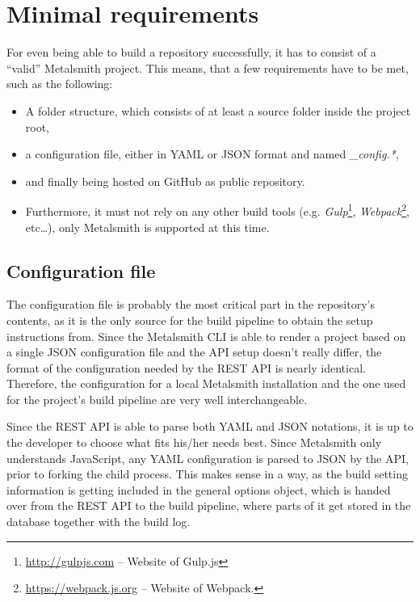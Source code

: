 \section{Minimal requirements}
\label{sec:minimalrequirements}

For even being able to build a repository successfully, it has to consist of a ``valid'' Metalsmith project. This means, that a few requirements have to be met, such as the following:

\begin{itemize}
  \item A folder structure, which consists of at least a source folder inside the project root,
  \item a configuration file, either in YAML or JSON format and named \emph{\_config.*},
  \item and finally being hosted on GitHub as public repository.
  \item Furthermore, it must not rely on any other build tools (e.g. \emph{Gulp}\footnote{\url{http://gulpjs.com} -- Website of Gulp.js}, \emph{Webpack}\footnote{\url{https://webpack.js.org} -- Website of Webpack.}, etc\ldots), only Metalsmith is supported at this time.
\end{itemize}

\subsection{Configuration file}
\label{sec:minimalrequirements-configuration}
The configuration file is probably the most critical part in the repository's contents, as it is the only source for the build pipeline to obtain the setup instructions from. Since the Metalsmith CLI is able to render a project based on a single JSON configuration file and the API setup doesn't really differ, the format of the configuration needed by the REST API is nearly identical. Therefore, the configuration for a local Metalsmith installation and the one used for the project's build pipeline are very well interchangeable.



Since the REST API is able to parse both YAML and JSON notations, it is up to the developer to choose what fits his/her needs best. Since Metalsmith only understands JavaScript, any YAML configuration is parsed to JSON by the API, prior to forking the child process. This makes sense in a way, as the build setting information is getting included in the general options object, which is handed over from the REST API to the build pipeline, where parts of it get stored in the database together with the build log.

